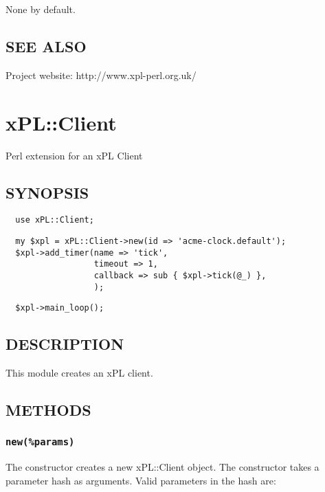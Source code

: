 \documentclass[12pt,a4paper]{article}
\begin{document}
None by default.

\subsection*{SEE ALSO\label{xPL::Bridge_SEE_ALSO}}


Project website: http://www.xpl-perl.org.uk/

\newpage
\section{xPL::Client\label{xPL::Client}}


Perl extension for an xPL Client

\subsection*{SYNOPSIS\label{xPL::Client_SYNOPSIS}}
\begin{verbatim}
  use xPL::Client;
\end{verbatim}
\begin{verbatim}
  my $xpl = xPL::Client->new(id => 'acme-clock.default');
  $xpl->add_timer(name => 'tick',
                  timeout => 1,
                  callback => sub { $xpl->tick(@_) },
                  );
\end{verbatim}
\begin{verbatim}
  $xpl->main_loop();
\end{verbatim}
\subsection*{DESCRIPTION\label{xPL::Client_DESCRIPTION}}


This module creates an xPL client.

\subsection*{METHODS\label{xPL::Client_METHODS}}
\subsubsection*{\texttt{new(\%params)}\label{xPL::Client_new_params_}}


The constructor creates a new xPL::Client object.  The constructor
takes a parameter hash as arguments.  Valid parameters in the hash
are:
\end{document}
